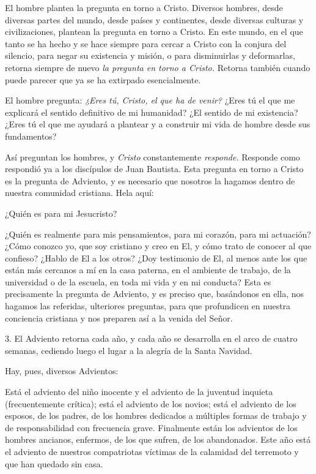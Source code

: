 \begin{body}
\begin{body}
El hombre plantea la pregunta en torno a Cristo. Diversos hombres, desde
diversas partes del mundo, desde países y continentes, desde diversas
culturas y civilizaciones, plantean la pregunta en torno a Cristo. En
este mundo, en el que tanto se ha hecho y se hace siempre para cercar a
Cristo con la conjura del silencio, para negar su existencia y misión, o
para disminuirlas y deformarlas, retorna siempre de nuevo \emph{la
	pregunta en torno a Cristo.} Retorna también cuando puede parecer que ya
se ha extirpado esencialmente.

El hombre pregunta: \emph{¿Eres tú, Cristo, el que ha de venir?} ¿Eres
tú el que me explicará el sentido definitivo de mi humanidad? ¿El
sentido de mi existencia? ¿Eres tú el que me ayudará a plantear y a
construir mi vida de hombre desde sus fundamentos?

Así preguntan los hombres, y \emph{Cristo} constantemente
\emph{responde.} Responde como respondió ya a los discípulos de Juan
Bautista. Esta pregunta en torno a Cristo es la pregunta de Adviento, y
es necesario que nosotros la hagamos dentro de nuestra comunidad
cristiana. Hela aquí:

¿Quién es para mi Jesucristo?

¿Quién es realmente para mis pensamientos, para mi corazón, para mi
actuación? ¿Cómo conozco yo, que soy cristiano y creo en El, y cómo
trato de conocer al que confieso? ¿Hablo de El a los otros? ¿Doy
testimonio de El, al menos ante los que están más cercanos a mí en la
casa paterna, en el ambiente de trabajo, de la universidad o de la
escuela, en toda mi vida y en mi conducta? Esta es precisamente la
pregunta de Adviento, y es preciso que, basándonos en ella, nos hagamos
las referidas, ulteriores preguntas, para que profundicen en nuestra
conciencia cristiana y nos preparen así a la venida del Señor.

3. El Adviento retorna cada año, y cada año se desarrolla en el arco de
cuatro semanas, cediendo luego el lugar a la alegría de la Santa
Navidad.

Hay, pues, diversos Advientos:

Está el adviento del niño inocente y el adviento de la juventud inquieta
(frecuentemente crítica); está el adviento de los novios; está el
adviento de los esposos, de los padres, de los hombres dedicados a
múltiples formas de trabajo y de responsabilidad con frecuencia grave.
Finalmente están los advientos de los hombres ancianos, enfermos, de los
que sufren, de los abandonados. Este año está el adviento de nuestros
compatriotas víctimas de la calamidad del terremoto y que han quedado
sin casa.


\end{body}
\end{body}
